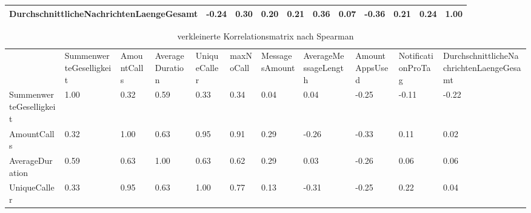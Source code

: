\begin{table}[]
\begin{tabular}{@{}l|llllllllll@{}}
\multicolumn{1}{|l|}{DurchschnittlicheNachrichtenLaengeGesamt} & \cellcolor[HTML]{4FD22F}-0.24                & 0.30                                                 & 0.20                                 & 0.21                                                & 0.36                           & 0.07                                & -0.36                                     & 0.21                                & 0.24                                    & 1.00                                                          \\ \bottomrule
\end{tabular}
\end{table}

\begin{table}[]
\centering
\caption{verkleinerte Korrelationsmatrix nach Spearman}
\label{cormatrixspearman}
\begin{tabular}{lllllllllll}
                                         & SummenwerteGeselligkeit       & AmountCalls                  & AverageDuration              & UniqueCaller                 & maxNoCall                    & MessagesAmount               & AverageMessageLength         & AmountAppsUsed                & NotificationProTag            & DurchschnittlicheNachrichtenLaengeGesamt \\
SummenwerteGeselligkeit                  & 1.00                          & \cellcolor[HTML]{4FD22F}0.32 & \cellcolor[HTML]{4FD22F}0.59 & \cellcolor[HTML]{4FD22F}0.33 & \cellcolor[HTML]{4FD22F}0.34 & \cellcolor[HTML]{4FD22F}0.04 & \cellcolor[HTML]{4FD22F}0.04 & \cellcolor[HTML]{4FD22F}-0.25 & \cellcolor[HTML]{4FD22F}-0.11 & \cellcolor[HTML]{4FD22F}-0.22            \\
AmountCalls                              & \cellcolor[HTML]{4FD22F}0.32  & 1.00                         & 0.63                         & 0.95                         & 0.91                         & 0.29                         & -0.26                        & -0.33                         & 0.11                          & 0.02                                     \\
AverageDuration                          & \cellcolor[HTML]{4FD22F}0.59  & 0.63                         & 1.00                         & 0.63                         & 0.62                         & 0.29                         & 0.03                         & -0.26                         & 0.06                          & 0.06                                     \\
UniqueCaller                             & \cellcolor[HTML]{4FD22F}0.33  & 0.95                         & 0.63                         & 1.00                         & 0.77                         & 0.13                         & -0.31                        & -0.25                         & 0.22                          & 0.04                                     \\

\end{tabular}
\end{table}
